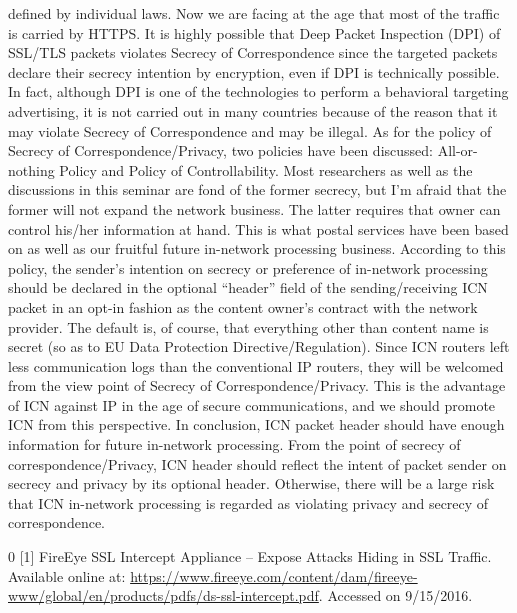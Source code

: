 \documentclass[a4paper,UKenglish]{dagrep}
\begin{document}
defined by individual laws.
Now we are facing at the age that most of the traffic is carried by
HTTPS. It is highly possible that Deep Packet Inspection (DPI) of
SSL/TLS packets violates Secrecy of Correspondence since the targeted
packets declare their secrecy intention by encryption, even if DPI
is technically possible. In fact, although DPI is one of the
technologies to perform a behavioral targeting advertising, it is not
carried out in many countries because of the reason that it may violate
Secrecy of Correspondence and may be illegal.
As for the policy of Secrecy of Correspondence/Privacy, two policies
have been discussed: All-or-nothing Policy and Policy of Controllability.
Most researchers as well as the discussions in this seminar are fond
of the former secrecy, but I’m afraid that the former will not expand
the network business. The latter requires that owner can control his/her
information at hand. This is what postal services have been based on as
well as our fruitful future in-network processing business. According to
this policy, the sender's intention on secrecy or preference of
in-network processing should be declared in the optional ``header'' field
of the sending/receiving ICN packet in an opt-in fashion as the content
owner's contract with the network provider. The default is, of course,
that everything other than content name is secret (so as to EU Data
Protection Directive/Regulation). Since ICN routers left less
communication logs than the conventional IP routers, they will be
welcomed from the view point of Secrecy of Correspondence/Privacy. This
is the advantage of ICN against IP in the age of secure communications,
and we should promote ICN from this perspective.
In conclusion, ICN packet header should have enough information for
future in-network processing. From the point of secrecy of
correspondence/Privacy, ICN header should reflect the intent of
packet sender on secrecy and privacy by its optional header. Otherwise,
there will be a large risk that ICN in-network processing is regarded as
violating privacy and secrecy of correspondence.

\begin{thebibliography}{0}
[1] FireEye SSL Intercept Appliance -- Expose Attacks Hiding in SSL Traffic. Available online at: \url{https://www.fireeye.com/content/dam/fireeye-www/global/en/products/pdfs/ds-ssl-intercept.pdf}. Accessed on 9/15/2016.
\end{thebibliography}

%
\end{document}
